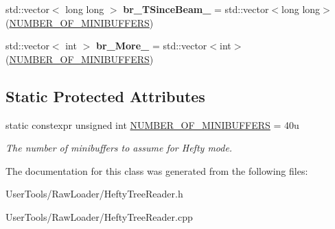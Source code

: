 \begin{DoxyCompactItemize}
\item 
\hypertarget{classannie_1_1HeftyTreeReader_a8e22c0da1a46e96fa224b620c5479d08}{std\-::vector$<$ long long $>$ {\bfseries br\-\_\-\-T\-Since\-Beam\-\_\-} = std\-::vector$<$long long$>$(\hyperlink{classannie_1_1HeftyTreeReader_a3ed132051c32e82aa67c7df43eacd77c}{N\-U\-M\-B\-E\-R\-\_\-\-O\-F\-\_\-\-M\-I\-N\-I\-B\-U\-F\-F\-E\-R\-S})}\label{classannie_1_1HeftyTreeReader_a8e22c0da1a46e96fa224b620c5479d08}

\item 
\hypertarget{classannie_1_1HeftyTreeReader_a5f8ade8dd21cfe7393744a4ab5e20a72}{std\-::vector$<$ int $>$ {\bfseries br\-\_\-\-More\-\_\-} = std\-::vector$<$int$>$(\hyperlink{classannie_1_1HeftyTreeReader_a3ed132051c32e82aa67c7df43eacd77c}{N\-U\-M\-B\-E\-R\-\_\-\-O\-F\-\_\-\-M\-I\-N\-I\-B\-U\-F\-F\-E\-R\-S})}\label{classannie_1_1HeftyTreeReader_a5f8ade8dd21cfe7393744a4ab5e20a72}

\end{DoxyCompactItemize}
\subsection*{Static Protected Attributes}
\begin{DoxyCompactItemize}
\item 
\hypertarget{classannie_1_1HeftyTreeReader_a3ed132051c32e82aa67c7df43eacd77c}{static constexpr unsigned int \hyperlink{classannie_1_1HeftyTreeReader_a3ed132051c32e82aa67c7df43eacd77c}{N\-U\-M\-B\-E\-R\-\_\-\-O\-F\-\_\-\-M\-I\-N\-I\-B\-U\-F\-F\-E\-R\-S} = 40u}\label{classannie_1_1HeftyTreeReader_a3ed132051c32e82aa67c7df43eacd77c}

\begin{DoxyCompactList}\small\item\em The number of minibuffers to assume for Hefty mode. \end{DoxyCompactList}\end{DoxyCompactItemize}


The documentation for this class was generated from the following files\-:\begin{DoxyCompactItemize}
\item 
User\-Tools/\-Raw\-Loader/Hefty\-Tree\-Reader.\-h\item 
User\-Tools/\-Raw\-Loader/Hefty\-Tree\-Reader.\-cpp\end{DoxyCompactItemize}
